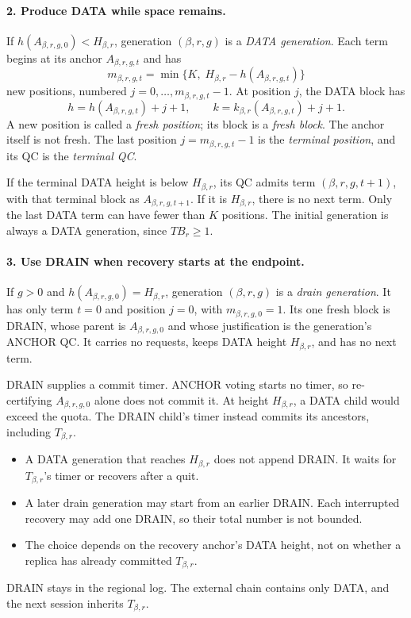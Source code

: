 \documentclass[11pt,a4paper]{article}
\newcommand{\TB}{\mathit{TB}}
\newcommand{\defterm}[1]{\textcolor{rrBlue}{\textit{#1}}}
\begin{document}
\paragraph{2. Produce DATA while space remains.}
If $h(A_{\beta,r,g,0})<H_{\beta,r}$, generation $(\beta,r,g)$ is a \defterm{DATA generation}.
Each term begins at its anchor $A_{\beta,r,g,t}$ and has
\[
 m_{\beta,r,g,t}=\min\{K,\;H_{\beta,r}-h(A_{\beta,r,g,t})\}
\]
new positions, numbered $j=0,\ldots,m_{\beta,r,g,t}-1$. At position $j$, the
DATA block has
\[
 h=h(A_{\beta,r,g,t})+j+1,\qquad
 k=k_{\beta,r}(A_{\beta,r,g,t})+j+1.
\]
A new position is called a \defterm{fresh position}; its block is a
\defterm{fresh block}. The anchor itself is not fresh. The last position
$j=m_{\beta,r,g,t}-1$ is the \defterm{terminal position}, and its QC is the
\defterm{terminal QC}.

If the terminal DATA height is below $H_{\beta,r}$, its QC admits term
$(\beta,r,g,t+1)$, with that terminal block as $A_{\beta,r,g,t+1}$. If it is $H_{\beta,r}$,
there is no next term. Only the last DATA term can have fewer than $K$
positions. The initial generation is always a DATA generation, since
$\TB_r\ge1$.

\paragraph{3. Use DRAIN when recovery starts at the endpoint.}
If $g>0$ and $h(A_{\beta,r,g,0})=H_{\beta,r}$, generation $(\beta,r,g)$ is a
\defterm{drain generation}. It has only term $t=0$ and position $j=0$,
with $m_{\beta,r,g,0}=1$. Its one fresh block is DRAIN, whose parent is
$A_{\beta,r,g,0}$ and whose justification is the generation's ANCHOR QC.
It carries no requests, keeps DATA height $H_{\beta,r}$, and has no next term.

DRAIN supplies a commit timer. ANCHOR voting starts no timer, so
re-certifying $A_{\beta,r,g,0}$ alone does not commit it. At height $H_{\beta,r}$, a
DATA child would exceed the quota. The DRAIN child's timer instead
commits its ancestors, including $T_{\beta,r}$.
\begin{itemize}
\item A DATA generation that reaches $H_{\beta,r}$ does not append DRAIN.
It waits for $T_{\beta,r}$'s timer or recovers after a quit.
\item A later drain generation may start from an earlier DRAIN.
Each interrupted recovery may add one DRAIN, so their total number
is not bounded.
\item The choice depends on the recovery anchor's DATA height, not on
whether a replica has already committed $T_{\beta,r}$.
\end{itemize}
DRAIN stays in the regional log. The external chain contains only DATA,
and the next session inherits $T_{\beta,r}$.
\end{document}
